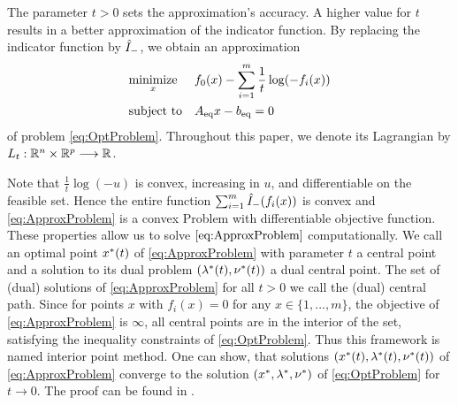 The parameter $ t>0 $ sets the approximation's accuracy. A higher value for $ t $ results in a better approximation of the indicator function.
By replacing the indicator function by $ {\hat{I}}_{\mathrm{-}} $, we obtain an
approximation 
\begin{equation}
\begin{aligned}
& \underset{x}{\text{minimize}}
& & f_0(x) - \sum_{i=1}^{m} \frac{1}{t} \log(-f_i(x)) \\
& \text{subject to}
& & {A}_{\mathrm{eq}} x - {b}_{\mathrm{eq}} = 0
\end{aligned} \label{eq:ApproxProblem}
\end{equation}
of problem \eqref{eq:OptProblem}. Throughout this paper, we denote its  Lagrangian by $ L_t: \mathbb{R}^n \times \mathbb{R}^p \longrightarrow \mathbb{R} $.

Note that $ \frac{1}{t}\log(-u) $ is convex, increasing in $ u $, and differentiable on the feasible set. Hence the entire function $ \sum_{i=1}^{m} {\hat{I}}_{\mathrm{-}}(f_i(x)) $ is convex and \eqref{eq:ApproxProblem} is a convex Problem with differentiable objective function. These properties allow us to solve $ \eqref{eq:ApproxProblem} $ computationally.
We call an optimal point $ x^*(t) $ of \eqref{eq:ApproxProblem} with parameter $ t $  a central point and a solution to its dual problem $ (\lambda^*(t),\nu^*(t)) $ a dual central point. The set of (dual) solutions of \eqref{eq:ApproxProblem} for all $ t>0 $ we call the (dual) central path. Since for points $ x $ with $ f_i(x) = 0 $ for any $ x \in \{1,\dots,m \} $, the objective of \eqref{eq:ApproxProblem} is $ \infty $, all central points are in the interior of the set, satisfying the inequality constraints of \eqref{eq:OptProblem}. Thus this framework is named interior point method. One can show, that solutions $ (x^*(t),\lambda^*(t),\nu^*(t)) $ of \eqref{eq:ApproxProblem} converge to the solution  $ (x^*,\lambda^*, \nu^*) $ of \eqref{eq:OptProblem} for $ t  \longrightarrow 0 $. The proof can be found in \cite{BV}.
\label{sec:BarrierConcept}
